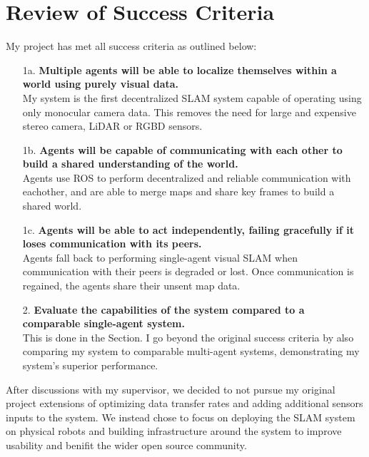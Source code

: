 

\label{sec:4}

\section{Review of Success Criteria}
\label{sec:review-of-success-criteria}
My project has met all success criteria as outlined below:

\begin{enumerate}[font=\bfseries]
    \item[1a.]\textbf{Multiple agents will be able to localize themselves within a world using purely visual data.} \\
    My system is the first decentralized SLAM system capable of operating using only monocular camera data. This removes the need for large and expensive stereo camera, LiDAR or RGBD sensors.

    \item[1b.]\textbf{Agents will be capable of communicating with each other to build a shared understanding of the world.} \\
    Agents use ROS to perform decentralized and reliable communication with eachother, and are able to merge maps and share key frames to build a shared world.

    \item[1c.]\textbf{Agents will be able to act independently, failing gracefully if it loses communication with its peers.} \\
    Agents fall back to performing single-agent visual SLAM when communication with their peers is degraded or lost. Once communication is regained, the agents share their unsent map data.

    \item[2.]\textbf{Evaluate the capabilities of the system compared to a comparable single-agent system.} \\
    This is done in the  Section. I go beyond the original success criteria by also comparing my system to comparable multi-agent systems, demonstrating my system's superior performance.

\end{enumerate}


After discussions with my supervisor, we decided to not pursue my original project extensions of optimizing data transfer rates and adding additional sensors inputs to the system. We instead chose to focus on deploying the SLAM system on physical robots and building infrastructure around the system to improve usability and benifit the wider open source community.

